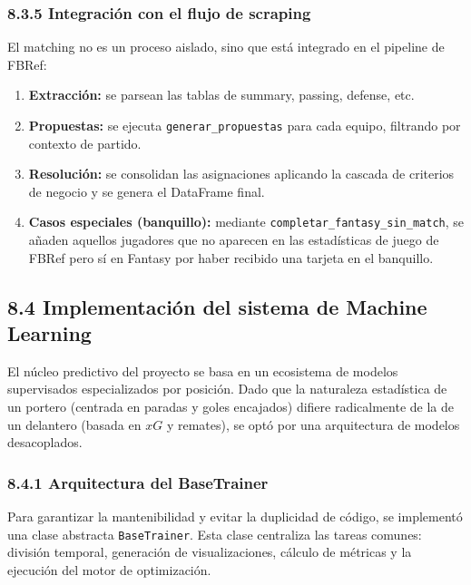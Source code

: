 \subsubsection{8.3.5 Integración con el flujo de scraping}

El matching no es un proceso aislado, sino que está integrado en el pipeline de FBRef:

\begin{enumerate}
\item \textbf{Extracción:} se parsean las tablas de summary, passing, defense, etc.

\item \textbf{Propuestas:} se ejecuta \texttt{generar\_propuestas} para cada equipo, filtrando por contexto de partido.

\item \textbf{Resolución:} se consolidan las asignaciones aplicando la cascada de criterios de negocio y se genera el DataFrame final.

\item \textbf{Casos especiales (banquillo):} mediante \texttt{completar\_fantasy\_sin\_match}, se añaden aquellos jugadores que no aparecen en las estadísticas de juego de FBRef pero sí en Fantasy por haber recibido una tarjeta en el banquillo.
\end{enumerate}

\subsection{8.4 Implementación del sistema de Machine Learning}

El núcleo predictivo del proyecto se basa en un ecosistema de modelos supervisados especializados por posición. Dado que la naturaleza
 estadística de un portero (centrada en paradas y goles encajados) difiere radicalmente de la de un delantero (basada en $xG$ y remates), 
 se optó por una arquitectura de modelos desacoplados.

\subsubsection{8.4.1 Arquitectura del BaseTrainer}

Para garantizar la mantenibilidad y evitar la duplicidad de código, se 
implementó una clase abstracta \texttt{BaseTrainer}. Esta clase centraliza las 
tareas comunes: división temporal, generación de visualizaciones, cálculo de 
métricas y la ejecución del motor de optimización.

